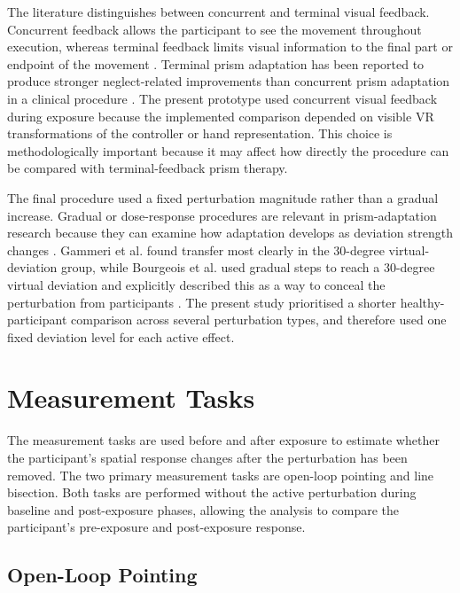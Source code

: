 The literature distinguishes between concurrent and terminal visual feedback. Concurrent feedback allows the participant to see the movement throughout execution, whereas terminal feedback limits visual information to the final part or endpoint of the movement \cite{Serino2011}. Terminal prism adaptation has been reported to produce stronger neglect-related improvements than concurrent prism adaptation in a clinical procedure \cite{Serino2011}. The present prototype used concurrent visual feedback during exposure because the implemented comparison depended on visible VR transformations of the controller or hand representation. This choice is methodologically important because it may affect how directly the procedure can be compared with terminal-feedback prism therapy.

The final procedure used a fixed perturbation magnitude rather than a gradual increase. Gradual or dose-response procedures are relevant in prism-adaptation research because they can examine how adaptation develops as deviation strength changes \cite{Gammeri2020,Bourgeois2021}. Gammeri et al. found transfer most clearly in the 30-degree virtual-deviation group, while Bourgeois et al. used gradual steps to reach a 30-degree virtual deviation and explicitly described this as a way to conceal the perturbation from participants \cite{Gammeri2020,Bourgeois2021}. The present study prioritised a shorter healthy-participant comparison across several perturbation types, and therefore used one fixed deviation level for each active effect.

\section{Measurement Tasks}
\label{sec:method-measurement-tasks}

The measurement tasks are used before and after exposure to estimate whether the participant's spatial response changes after the perturbation has been removed. The two primary measurement tasks are open-loop pointing and line bisection. Both tasks are performed without the active perturbation during baseline and post-exposure phases, allowing the analysis to compare the participant's pre-exposure and post-exposure response.

\subsection{Open-Loop Pointing}
\label{subsec:method-open-loop}


